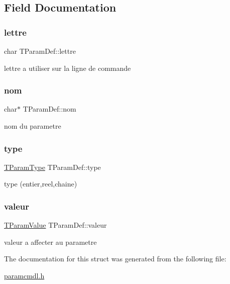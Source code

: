 \subsection{Field Documentation}
\mbox{\label{structTParamDef_a66254f6368c5542d3f14afdd1ea1e621}} 
\subsubsection{\texorpdfstring{lettre}{lettre}}
{\footnotesize\ttfamily char T\+Param\+Def\+::lettre}

lettre a utiliser sur la ligne de commande \mbox{\label{structTParamDef_afa78db012abc7fecd18c60d6154e04f8}} 
\subsubsection{\texorpdfstring{nom}{nom}}
{\footnotesize\ttfamily char$\ast$ T\+Param\+Def\+::nom}

nom du parametre \mbox{\label{structTParamDef_aaa8c69f39c6dd02a968dc15044810327}} 
\subsubsection{\texorpdfstring{type}{type}}
{\footnotesize\ttfamily \hyperlink{paramcmdl_8h_a07d4e5a29d675892ddc5f377533c06a5}{T\+Param\+Type} T\+Param\+Def\+::type}

type (entier,reel,chaine) \mbox{\label{structTParamDef_a3f5cbf75e393d35bb230dfe293f7c7ba}} 
\subsubsection{\texorpdfstring{valeur}{valeur}}
{\footnotesize\ttfamily \hyperlink{unionTParamValue}{T\+Param\+Value} T\+Param\+Def\+::valeur}

valeur a affecter au parametre 

The documentation for this struct was generated from the following file\+:\begin{DoxyCompactItemize}
\item 
\hyperlink{paramcmdl_8h}{paramcmdl.\+h}\end{DoxyCompactItemize}
